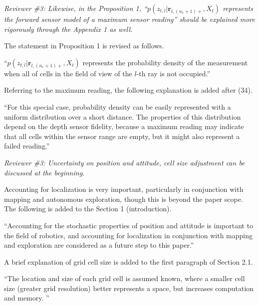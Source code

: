 \documentclass[11pt]{article}
\newenvironment{correction}{\begin{list}{}{\setlength{\leftmargin}{1cm}\setlength{\rightmargin}{1cm}}\vspace{\parsep}\item[]``}{''\end{list}}
\begin{document}
\begin{itemize}
\item {\itshape Reviewer \#3: Likewise, in the Proposition 1, ``$p(z_{t,l}|\mathbf{r}_{l,(n_r+1)+},X_t)$ represents the forward sensor model of a maximum sensor reading'' should be explained more rigorously through the Appendix 1 as well.}

The statement in Proposition 1 is revised as follows.

\begin{correction}$p(z_{t,l}|\mathbf{r}_{l,(n_r+1)+},X_t)$ represents the probability density of the measurement when all of cells in the field of view of the $l$-th ray is not occupied.\end{correction}

Referring to the maximum reading, the following explanation is added after (34).

\begin{correction}For this special case, probability density can be easily represented with a uniform distribution over a short distance. The properties of this distribution depend on the depth sensor fidelity, because a maximum reading may indicate that all cells within the sensor range are empty, but it might also represent a failed reading.\end{correction}

\item {\itshape Reviewer \#3: Uncertainty on position and attitude, cell size adjustment can be discussed at the beginning.}

Accounting for localization is very important, particularly in conjunction with mapping and autonomous exploration, though this is beyond the paper scope. The following is added to the Section 1 (introduction).

\begin{correction}Accounting for the stochastic properties of position and attitude is important to the field of robotics, and accounting for localization in conjunction with mapping and exploration are considered as a future step to this paper.\end{correction}

A brief explanation of grid cell size is added to the first paragraph of Section 2.1.

\begin{correction}The location and size of each grid cell is assumed known, where a smaller cell size (greater grid resolution) better represents a space, but increases computation and memory. \end{correction}


\end{itemize}
\end{document}
